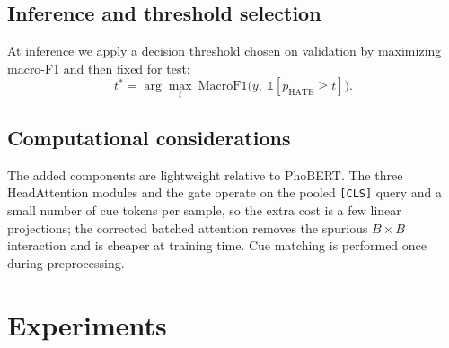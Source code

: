 \documentclass[11pt]{article}
\begin{document}
\subsection{Inference and threshold selection}
At inference we apply a decision threshold chosen on validation by maximizing macro-F1 and then fixed for test:
\begin{equation}
  t^{*} = \arg\max_t\ \mathrm{MacroF1}\big(y,\ \mathbb{1}[p_{\mathrm{HATE}}\ge t]\big).
\end{equation}

\subsection{Computational considerations}
The added components are lightweight relative to PhoBERT. The three HeadAttention modules and the gate operate on the pooled \texttt{[CLS]} query and a small number of cue tokens per sample, so the extra cost is a few linear projections; the corrected batched attention removes the spurious $B\times B$ interaction and is cheaper at training time. Cue matching is performed once during preprocessing.

\section{Experiments}
\end{document}
